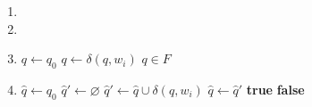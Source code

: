 \documentclass[11pt,a4paper]{article}
\begin{document}
\begin{loesung}
    \begin{enumerate}
        \item 
        \item 
        \item 
        \begin{algorithmic}[1]
                \State $q \gets q_0$
                    \State $q \gets \delta(q, w_i)$
                \EndFor
                \State \Return $q \in F$
            \EndProcedure
        \end{algorithmic}
        \item 
        \begin{algorithmic}[1]
                \State $\hat{q} \gets q_0$
                    \State $\hat{q}' \gets \varnothing$
                        \State $\hat{q}' \gets \hat{q} \cup \delta(q, w_i)$
                    \EndFor
                    \State $\hat{q} \gets \hat{q}'$
                \EndFor
                        \State \Return \textbf{true}
                    \EndIf
                \EndFor
                \State \Return \textbf{false}
            \EndProcedure
        \end{algorithmic}
    \end{enumerate}
\end{loesung}
\end{document}
